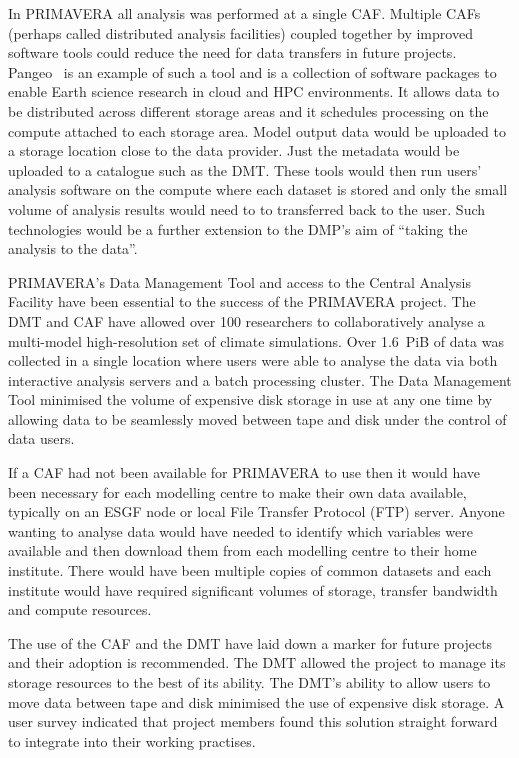 \documentclass[gmd, manuscript]{copernicus}
\begin{document}
In PRIMAVERA all analysis was performed at a single CAF. Multiple CAFs (perhaps called distributed analysis facilities) coupled together by improved software tools could reduce the need for data transfers in future projects. Pangeo~\citep{Pangeo} is an example of such a tool and is a collection of software packages to enable Earth science research in cloud and HPC environments. It allows data to be distributed across different storage areas and it schedules processing on the compute attached to each storage area. Model output data would be uploaded to a storage location close to the data provider. Just the metadata would be uploaded to a catalogue such as the DMT. These tools would then run users' analysis software on the compute where each dataset is stored and only the small volume of analysis results would need to to transferred back to the user. Such technologies would be a further extension to the DMP's aim of ``taking the analysis to the data''. 

\conclusions  %

PRIMAVERA's Data Management Tool and access to the Central Analysis Facility have been essential to the success of the PRIMAVERA project. The DMT and CAF have allowed over 100 researchers to collaboratively analyse a multi-model high-resolution set of climate simulations. Over 1.6~PiB of data was collected in a single location where users were able to analyse the data via both interactive analysis servers and a batch processing cluster. The Data Management Tool minimised the volume of expensive disk storage in use at any one time by allowing data to be seamlessly moved between tape and disk under the control of data users.

If a CAF had not been available for PRIMAVERA to use then it would have been necessary for each modelling centre to make their own data available, typically on an ESGF node or local File Transfer Protocol (FTP) server. Anyone wanting to analyse data would have needed to identify which variables were available and then download them from each modelling centre to their home institute. There would have been multiple copies of common datasets and each institute would have required significant volumes of storage, transfer bandwidth and compute resources.

The use of the CAF and the DMT have laid down a marker for future projects and their adoption is recommended. The DMT allowed the project to manage its storage resources to the best of its ability. The DMT's ability to allow users to move data between tape and disk minimised the use of expensive disk storage. A user survey indicated that project members found this solution straight forward to integrate into their working practises.
\end{document}
